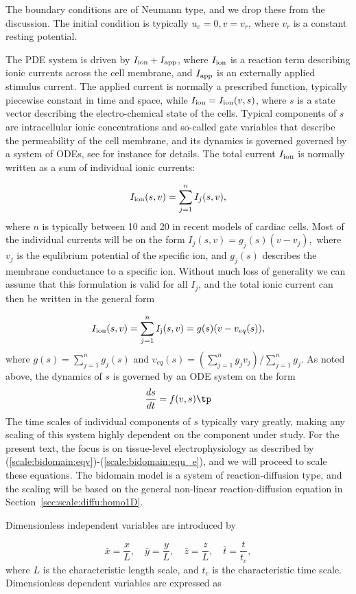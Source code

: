 \documentclass[graybox,envcountchap,sectrefs,final]{svmonodo}
\begin{document}
The boundary conditions are of Neumann type, and we drop these from the discussion.
The initial condition is typically $u_e=0, v = v_r$, where
$v_{r}$ is a constant resting potential.

The PDE system is driven by $I_{\rm{ion}} + I_{\rm{app}}$, where
$I_{\rm{ion}}$ is a reaction term describing ionic currents across the
cell membrane, and $ I_{\rm{app}}$ is an externally applied stimulus
current. The applied current is normally a prescribed function,
typically piecewise constant in time and space, while
$I_{\rm{ion}} = I_{\rm{ion}}(v,s)$, where $s$ is a state vector
describing the electro-chemical state of the cells. Typical components
of $s$ are intracellular ionic concentrations and so-called gate variables that
describe the permeability of the cell membrane, and its dynamics is
governed governed by a system of ODEs, see for instance \cite{Sundnes_2006} for
details. The total
current $I_{\rm{ion}}$ is normally written as a sum of individual
ionic currents:

\[ I_{\rm{ion}}(s,v) = \sum_{j=1}^n I_{j}(s,v), \]
where $n$ is typically between 10 and 20 in recent models of cardiac
cells. Most of the individual currents will be on the form
$ I_{j}(s,v) = g_j(s)(v-v_j), $
where $v_j$ is the equlibrium potential of the specific ion, and
$g_j(s)$ describes the membrane conductance to a specific ion. Without
much loss of generality we can assume that this formulation is valid
for all $I_{j}$, and the total ionic current can then be written in the
general form

\[
I_{\rm{ion}}(s,v) = \sum_{j=1}^n I_{\rm{j}}(s,v) = g(s)(v-v_{eq}(s)) ,
\]
where $g(s) = \sum_{j=1}^n g_j(s)$ and $v_{eq}(s) = (\sum_{j=1}^n g_j
v_j)/\sum_{j=1}^n g_j$.
As noted above, the dynamics of $s$ is governed by an ODE system on
the form
\[
\frac{ds}{dt} = f(v,s) \tp
\]
The time scales of individual components of $s$ typically vary
greatly, making any scaling of this system highly dependent on the
component under study. For the present text, the focus is on
tissue-level electrophysiology as described by
(\ref{scale:bidomain:eqv})-(\ref{scale:bidomain:equ_e}), and we will proceed
to scale these equations. The bidomain model is a system of
reaction-diffusion type, and the scaling will be based on the general
non-linear reaction-diffusion equation in Section~\ref{sec:scale:diffu:homo1D}.

Dimensionless independent variables are introduced by

\[ \bar x = \frac{x}{L},\quad
\bar y = \frac{y}{L},\quad \bar z = \frac{z}{L},\quad
\bar t = \frac{t}{t_c},\]
where $L$ is the characteristic length scale, and $t_c$ is the
characteristic time scale. Dimensionless dependent variables are
expressed as
\end{document}
